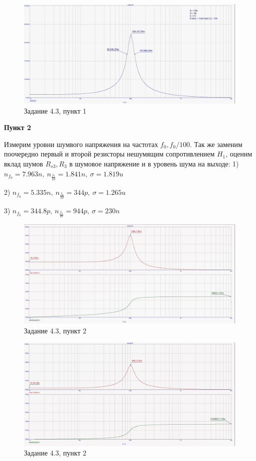 \documentclass[a4paper, 14pt]{extarticle}%
\begin{document}
\begin{figure}[h!]
			\centering
			\includegraphics[width=1.1\linewidth]{4/4_3_2.jpg}
			\caption{Задание 4.3, пункт 1}
			\label{A}
\end{figure}


\textbf{Пункт 2}


Измерим уровни шумвого напряжения на частотах $f_0, f_0/100$. Так же заменим поочередно первый и второй резисторы нешумящим сопротивлением $H_1$, оценим вклад шумов $R_{s3}, R_3$ в шумовое напряжение и в уровень шума на выходе:
1) $n_{f_0} = 7.963n, \: n_{\frac{f_0}{10}} = 1.841n, \: \sigma = 1.819u$

2) $n_{f_0} = 5.335n, \: n_{\frac{f_0}{10}} = 344p, \: \sigma = 1.265u$

3) $n_{f_0} = 344.8p, \: n_{\frac{f_0}{10}} = 944p, \: \sigma = 230n$

\begin{figure}[h!]
			\centering
			\includegraphics[width=1.1\linewidth]{4/4_3_3.jpg}
			\caption{Задание 4.3, пункт 2}
			\label{A}
\end{figure}



\begin{figure}[h!]
			\centering
			\includegraphics[width=1.1\linewidth]{4/4_3_4.jpg}
			\caption{Задание 4.3, пункт 2}
			\label{A}
\end{figure}
\end{document}
